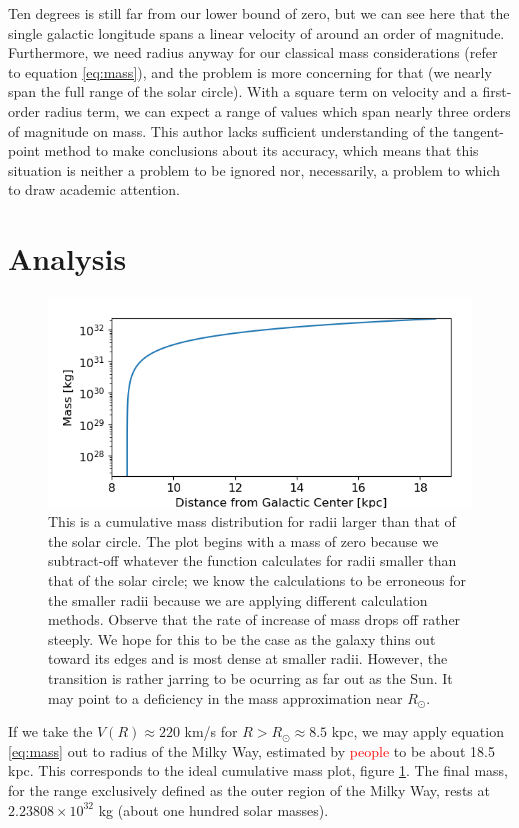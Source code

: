 \documentclass[12pt]{article}
\begin{document}
Ten degrees is still far from our lower bound of zero, but we can see here that the single galactic longitude spans a linear velocity of around an order of magnitude. Furthermore, we need radius anyway for our classical mass considerations (refer to equation \ref{eq:mass}), and the problem is more concerning for that (we nearly span the full range of the solar circle). With a square term on velocity and a first-order radius term, we can expect a range of values which span nearly three orders of magnitude on mass. This author lacks sufficient understanding of the tangent-point method to make conclusions about its accuracy, which means that this situation is neither a problem to be ignored nor, necessarily, a problem to which to draw academic attention.

\section{Analysis}

\begin{figure}
	\centering
	\includegraphics[width=.8\linewidth]{outer_mass_distro}
	\caption{This is a cumulative mass distribution for radii larger than that of the solar circle. The plot begins with a mass of zero because we subtract-off whatever the function calculates for radii smaller than that of the solar circle; we know the calculations to be erroneous for the smaller radii because we are applying different calculation methods. Observe that the rate of increase of mass drops off rather steeply. We hope for this to be the case as the galaxy thins out toward its edges and is most dense at smaller radii. However, the transition is rather jarring to be ocurring as far out as the Sun. It may point to a deficiency in the mass approximation near $R_\odot$.}
	\label{fig:outer_mass_distro}
\end{figure}

\quad \quad If we take the $V(R) \approx 220$ km/s for $R > R_\odot \approx 8.5$ kpc, we may apply equation \ref{eq:mass} out to radius of the Milky Way, estimated by \textcolor{red}{people} to be about 18.5 kpc. This corresponds to the ideal cumulative mass plot, figure \ref{fig:outer_mass_distro}. The final mass, for the range exclusively defined as the outer region of the Milky Way, rests at $2.23808 \times 10^{32}$ kg (about one hundred solar masses).
\end{document}

